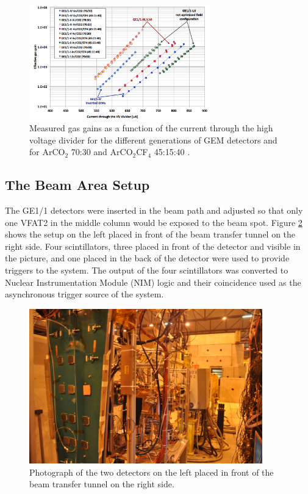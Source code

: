       \begin{figure}[h!]
        \centering
        \includegraphics[width=0.7\textwidth]{img/II-3-test-beam/gain.png}
        \caption{Measured gas gains as a function of the current through the high voltage divider for the different generations of GEM detectors and for ArCO$_2$ 70:30 and ArCO$_2$CF$_4$ 45:15:40 \cite{Merlin:2155685}.}
        \label{fig:II-3-gain}
      \end{figure}

    \subsection{The Beam Area Setup}

      The GE1/1 detectors were inserted in the beam path and adjusted so that only one VFAT2 in the middle column would be exposed to the beam spot. Figure \ref{fig:II-3-test-setup} shows the setup on the left placed in front of the beam transfer tunnel on the right side. Four scintillators, three placed in front of the detector and visible in the picture, and one placed in the back of the detector were used to provide triggers to the system. The output of the four scintillators was converted to Nuclear Instrumentation Module (NIM) logic and their coincidence used as the asynchronous trigger source of the system. \\

      \begin{figure}
        \centering
        \includegraphics[width=0.9\textwidth]{img/II-3-test-beam/test-setup.jpg}
        \caption{Photograph of the two detectors on the left placed in front of the beam transfer tunnel on the right side.}
        \label{fig:II-3-test-setup}
      \end{figure}

